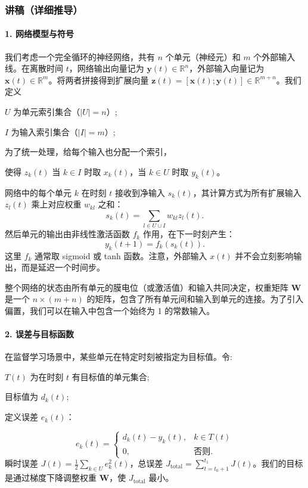 \documentclass[journal,12pt,onecolumn]{IEEEtran}
\begin{document}
\subsubsection*{讲稿（详细推导）}

\paragraph{1. 网络模型与符号}
我们考虑一个完全循环的神经网络，共有 $n$ 个单元（神经元）和 $m$ 个外部输入线。在离散时间 $t$，网络输出向量记为 $\mathbf{y}(t) \in \mathbb{R}^n$，外部输入向量记为 $\mathbf{x}(t) \in \mathbb{R}^m$。将两者拼接得到扩展向量 $\mathbf{z}(t) = [\mathbf{x}(t); \mathbf{y}(t)] \in \mathbb{R}^{m+n}$。我们定义

$U$ 为单元索引集合（$|U|=n$）;

$I$ 为输入索引集合（$|I|=m$）;

为了统一处理，给每个输入也分配一个索引，

使得 $z_k(t)$ 当 $k\in I$ 时取 $x_k(t)$，当 $k\in U$ 时取 $y_k(t)$。

网络中的每个单元 $k$ 在时刻 $t$ 接收到净输入 $s_k(t)$，其计算方式为所有扩展输入 $z_l(t)$ 乘上对应权重 $w_{kl}$ 之和：
\[
s_k(t) = \sum_{l\in U \cup I} w_{kl} z_l(t).
\]
然后单元的输出由非线性激活函数 $f_k$ 作用，在下一时刻产生：
\[
y_k(t+1) = f_k(s_k(t)).
\]
这里 $f_k$ 通常取 sigmoid 或 tanh 函数。注意，外部输入 $x(t)$ 并不会立刻影响输出，而是延迟一个时间步。

整个网络的状态由所有单元的膜电位（或激活值）和输入共同决定，权重矩阵 $\mathbf{W}$ 是一个 $n\times(m+n)$ 的矩阵，包含了所有单元间和输入到单元的连接。为了引入偏置，我们可以在输入中包含一个始终为 1 的常数输入。

\paragraph{2. 误差与目标函数}
在监督学习场景中，某些单元在特定时刻被指定为目标值。令:

$T(t)$ 为在时刻 $t$ 有目标值的单元集合;

目标值为 $d_k(t)$;

定义误差 $e_k(t)$：

\[
e_k(t) =
\begin{cases}
d_k(t) - y_k(t), & k\in T(t) \\
0, & \text{否则}.
\end{cases}
\]
瞬时误差 $J(t) = \frac{1}{2}\sum_{k\in U} e_k^2(t)$，总误差 $J_{\text{total}} = \sum_{t=t_0+1}^{t_1} J(t)$。我们的目标是通过梯度下降调整权重 $\mathbf{W}$，使 $J_{\text{total}}$ 最小。
\end{document}
